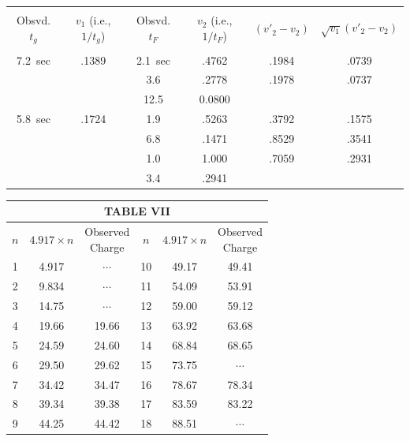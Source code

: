 \documentclass{article}
\begin{document}
\begin{center}
\small
\begin{tabular}{S S S S S S}
\hline\\[-10pt]
{Obsvd. $t_g$} & {$v_1$ (i.e., $1/t_g$)} & {Obsvd. $t_F$} & {$v_2$ (i.e., $1/t_F$)} & {\phantom{00}$(v'_2-v_2)$} & {$\sqrt{v_1}(v'_2-v_2)$}\\[1pt]
\hline\\[-10pt]
7.2\ {sec} & .1389 & 2.1\ {sec} & .4762 & .1984 & .0739\\
 & & 3.6 & .2778 & .1978 & .0737\\
 & & 12.5 & 0.0800 & &\\
5.8\ {sec} & .1724 & 1.9 & .5263 & .3792 & .1575\\
 & & 6.8 & .1471 & .8529 & .3541\\
 & & 1.0 & 1.000 & .7059 & .2931\\
 & & 3.4 & .2941 & &\\
\end{tabular}
\end{center}

\bigskip

\begin{center}
\begin{tabular}{c|c|c||c|c|c}
\multicolumn{6}{c}{TABLE VII}\\[3pt]
\hline
\hline
\rule{0pt}{1.5\normalbaselineskip}
$n$ & $4.917\!\times\!{n}$ & \makecell{\small{Observed}\\\small{Charge}} & $n$ & $4.917\!\times\!{n}$ & \makecell{\small{Observed}\\\small{Charge}}\\[8pt]
\hline
\rule{0pt}{1\normalbaselineskip}
1 & 4.917 & $\cdots$ & 10 & 49.17 & 49.41\\
2 & 9.834 & $\cdots$ & 11 & 54.09 & 53.91\\
3 & 14.75 & $\cdots$ & 12 & 59.00 & 59.12\\
4 & 19.66 & 19.66  & 13 & 63.92 & 63.68\\
5 & 24.59 & 24.60  & 14 & 68.84 & 68.65\\
6 & 29.50 & 29.62  & 15 & 73.75 & $\cdots$\\
7 & 34.42 & 34.47  & 16 & 78.67 & 78.34\\
8 & 39.34 & 39.38  & 17 & 83.59 & 83.22\\
9 & 44.25 & 44.42  & 18 & 88.51 & $\cdots$\\[3pt]
\hline
\end{tabular}
\end{center}
\end{document}
